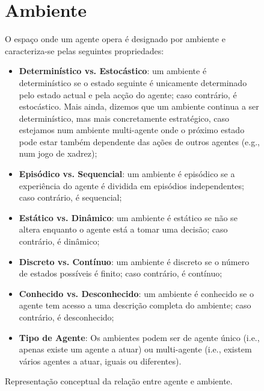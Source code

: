 \begin{figure}[h]
    \begin{center}
    \end{center}
    \caption{Representação conceptual da
    relação entre agente e ambiente.}\label{fig:modelo-agente-ambiente}

\section{Ambiente}

O espaço onde um agente opera é designado por ambiente e caracteriza-se pelas seguintes propriedades:

\begin{itemize}
    \item \textbf{Determinístico vs. Estocástico}: um ambiente é determinístico se o estado seguinte é unicamente determinado pelo estado actual e pela acção do agente; caso contrário, é estocástico. Mais ainda, dizemos que um ambiente continua a ser determinístico, mas mais concretamente estratégico, caso estejamos num ambiente multi-agente onde o próximo estado pode estar também dependente das ações de outros agentes (e.g., num jogo de xadrez);
    \item \textbf{Episódico vs. Sequencial}: um ambiente é episódico se a experiência do agente é dividida em episódios independentes; caso contrário, é sequencial;
    \item \textbf{Estático vs. Dinâmico}: um ambiente é estático se não se altera enquanto o agente está a tomar uma decisão; caso contrário, é dinâmico;
    \item \textbf{Discreto vs. Contínuo}: um ambiente é discreto se o número de estados possíveis é finito; caso contrário, é contínuo;
    \item \textbf{Conhecido vs. Desconhecido}: um ambiente é conhecido se o agente tem acesso a uma descrição completa do ambiente; caso contrário, é desconhecido;
    \item \textbf{Tipo de Agente}: Os ambientes podem ser de agente único (i.e., apenas existe um agente a atuar) ou multi-agente (i.e., existem vários agentes a atuar, iguais ou diferentes).
\end{itemize}


\end{figure}
